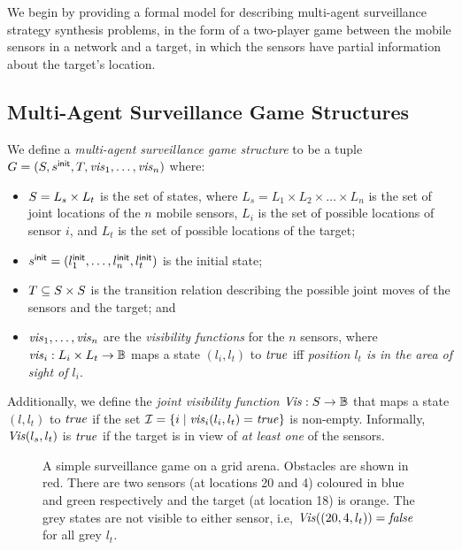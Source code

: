 We begin by providing a formal model for describing multi-agent surveillance strategy synthesis problems, in the form of a two-player game between the mobile sensors in a network and a target, in which the sensors have partial information about the target's location. 

\subsection{Multi-Agent Surveillance Game Structures}\label{sec:surveillance-games}
We define a \emph{multi-agent surveillance game structure} to be a tuple $G  = (S,s^{\mathsf{init}},T,\mathit{vis}_1,\dots,\mathit{vis}_n)$ where:
\begin{itemize}
\item $S = L_s \times L_t$ is the set of states, where $L_{s} = L_1 \times L_2 \times\dots \times L_n$ is the set of joint locations of the $n$ mobile sensors, $L_i$ is the set of possible locations of sensor $i$,  and $L_t$ is the set of possible locations of the target;
\item $s^{\mathsf{init}} = (l^{\mathsf{init}}_1,\ldots,l^{\mathsf{init}}_n,l_t^{\mathsf{init}})$ is the initial state;
\item $T \subseteq S \times S$ is the transition relation describing the possible joint moves of the sensors and the target; and
\item  $\mathit{vis}_1,\dots,\mathit{vis}_n$ are the \textit{visibility functions} for the $n$ sensors, where $\mathit{vis}_i: L_{i} \times L_t \to \mathbb{B}$ maps a state $(l_{i},l_t)$ to $\mathit{true}$ iff \emph{ position $l_t$ is in the area of sight of $l_i$}.
\end{itemize}

Additionally, we define the \emph{joint visibility function} $\mathit{Vis} : S \to \mathbb{B}$ that maps a state $(l,l_t)$ to $\mathit{true}$ if the set $\mathcal{I} = \{i \mid \mathit{vis}_i(l_i,l_t) = \mathit{true}\}$ is non-empty. Informally, $\mathit{Vis}(l_s,l_t)$ is $\mathit{true}$ if the target is in view of \emph{at least one} of the sensors.

\begin{figure}
{}
\caption{A simple surveillance game on a grid arena. Obstacles are shown in red. There are two sensors (at locations 20 and 4) coloured in blue and green respectively and the target (at location 18) is orange. The grey states are not visible to either sensor, i.e, $\mathit{Vis}((20,4,l_t)) = \mathit{false}$ for all grey $l_t$.}
\label{fig:simple-surveillance-game}
\vspace{-.7cm}
\end{figure}


